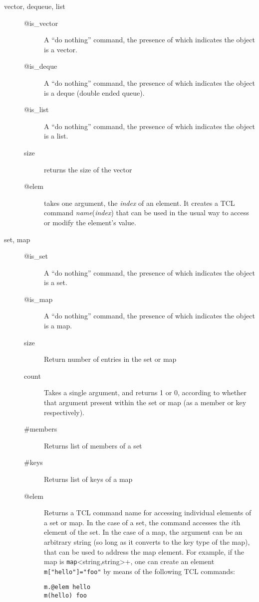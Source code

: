 \begin{description}
\item[vector, dequeue, list]\mbox{}
  \begin{description}
  \item[@is\_vector] A ``do nothing'' command, the presence of which
    indicates the object is a vector.
  \item[@is\_deque] A ``do nothing'' command, the presence of which
    indicates the object is a deque (double ended queue).
  \item[@is\_list] A ``do nothing'' command, the presence of which
    indicates the object is a list.
  \item[size] returns the size of the vector
  \item[@elem] takes one argument, the {\em index} of an element. It creates a
    TCL command {\em name}({\em index}) that can be used in the usual
    way to access or modify the element's value.
  \end{description}

\item[set, map]\mbox{}
  \begin{description}
  \item[@is\_set] A ``do nothing'' command, the presence of which
    indicates the object is a set.
  \item[@is\_map] A ``do nothing'' command, the presence of which
    indicates the object is a map.
  \item[size] Return number of entries in the set or map
  \item[count] Takes a single argument, and returns 1 or 0, according to
    whether that argument present within the set or map (as a member or
    key respectively).
  \item[\#members] Returns list of members of a set
  \item[\#keys] Returns list of keys of a map
  \item[@elem] Returns a TCL command name for accessing individual
    elements of a set or map. In the case of a set, the command accesses
  the $i$th element of the set. In the case of a map, the argument can
  be an arbitrary string (so long as it converts to the key type of
  the map), that can be used to address the map element. For example,
  if the map is \verb+map+<string,string>+, one can create an element
  \verb+m["hello"]="foo"+ by means of the following TCL commands:
\begin{verbatim}
m.@elem hello
m(hello) foo
\end{verbatim}
\end{description}
\end{description}

